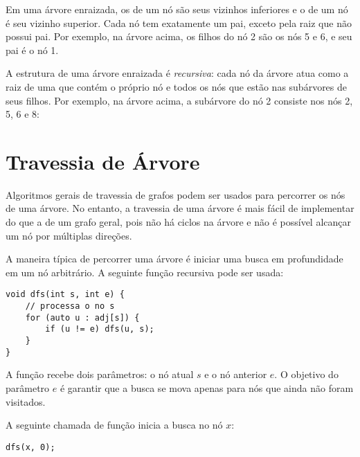 
Em uma árvore enraizada, os  de um nó são seus vizinhos inferiores e o  de um nó é seu vizinho superior. Cada nó tem exatamente um pai, exceto pela raiz que não possui pai. Por exemplo, na árvore acima, os filhos do nó 2 são os nós 5 e 6, e seu pai é o nó 1.


A estrutura de uma árvore enraizada é \emph{recursiva}: cada nó da árvore atua como a raiz de uma  que contém o próprio nó e todos os nós que estão nas subárvores de seus filhos. Por exemplo, na árvore acima, a subárvore do nó 2 consiste nos nós 2, 5, 6 e 8:
\begin{center}
\end{center}

\section{Travessia de Árvore}

Algoritmos gerais de travessia de grafos podem ser usados para percorrer os nós de uma árvore. No entanto, a travessia de uma árvore é mais fácil de implementar do que a de um grafo geral, pois não há ciclos na árvore e não é possível alcançar um nó por múltiplas direções.

A maneira típica de percorrer uma árvore é iniciar uma busca em profundidade em um nó arbitrário. A seguinte função recursiva pode ser usada:

\begin{lstlisting}
void dfs(int s, int e) {
    // processa o no s
    for (auto u : adj[s]) {
        if (u != e) dfs(u, s);
    }
}
\end{lstlisting}

A função recebe dois parâmetros: o nó atual $s$ e o nó anterior $e$. O objetivo do parâmetro $e$ é garantir que a busca se mova apenas para nós que ainda não foram visitados.

A seguinte chamada de função inicia a busca no nó $x$:

\begin{lstlisting}
dfs(x, 0);
\end{lstlisting}

